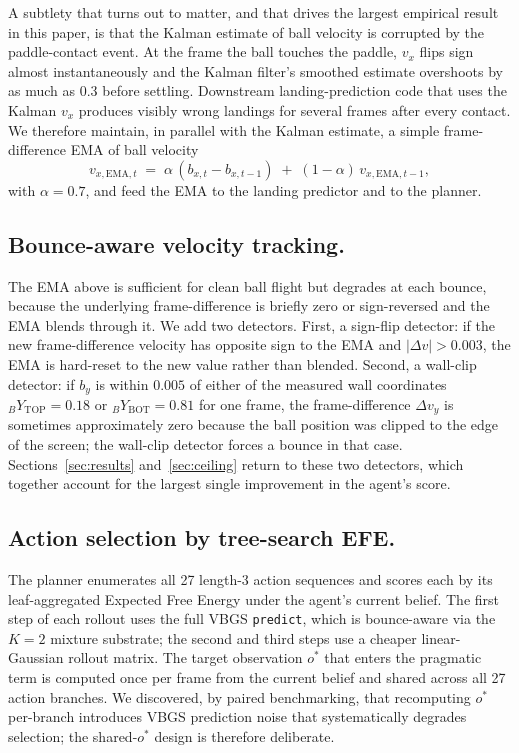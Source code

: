 \documentclass[runningheads]{llncs}
\begin{document}
A subtlety that turns out to matter, and that drives the largest
empirical result in this paper, is that the Kalman estimate of ball
velocity is corrupted by the paddle-contact event. At the frame the
ball touches the paddle, $v_x$ flips sign almost instantaneously
and the Kalman filter's smoothed estimate overshoots by as much as
$0.3$ before settling. Downstream landing-prediction code that uses
the Kalman $v_x$ produces visibly wrong landings for several frames
after every contact. We therefore maintain, in parallel with the
Kalman estimate, a simple frame-difference EMA of ball velocity
\[
  v_{x,\text{EMA},t}
  \;=\; \alpha\,(b_{x,t}-b_{x,t-1}) \;+\;(1-\alpha)\,v_{x,\text{EMA},t-1},
\]
with $\alpha = 0.7$, and feed the EMA to the landing predictor and
to the planner.

\subsection{Bounce-aware velocity tracking.}
The EMA above is sufficient for clean ball flight but degrades at
each bounce, because the underlying frame-difference is briefly
zero or sign-reversed and the EMA blends through it. We add two
detectors. First, a sign-flip detector: if the new
frame-difference velocity has opposite sign to the EMA and
$|\Delta v| > 0.003$, the EMA is hard-reset to the new value rather
than blended. Second, a wall-clip detector: if $b_y$ is within
$0.005$ of either of the measured wall coordinates $_BY_{\text{TOP}}=0.18$
or $_BY_{\text{BOT}}=0.81$ for one frame, the frame-difference $\Delta v_y$
is sometimes approximately zero because the ball position was
clipped to the edge of the screen; the wall-clip detector forces a
bounce in that case. Sections~\ref{sec:results} and~\ref{sec:ceiling}
return to these two detectors, which together account for the
largest single improvement in the agent's score.

\subsection{Action selection by tree-search EFE.}
The planner enumerates all 27 length-3 action sequences and scores
each by its leaf-aggregated Expected Free Energy under the agent's
current belief. The first step of each rollout uses the full VBGS
\texttt{predict}, which is bounce-aware via the $K{=}2$ mixture
substrate; the second and third steps use a cheaper
linear-Gaussian rollout matrix. The target observation $o^*$ that
enters the pragmatic term is computed once per frame from the
current belief and shared across all 27 action branches. We
discovered, by paired benchmarking, that recomputing $o^*$
per-branch introduces VBGS prediction noise that systematically
degrades selection; the shared-$o^*$ design is therefore deliberate.
\end{document}
